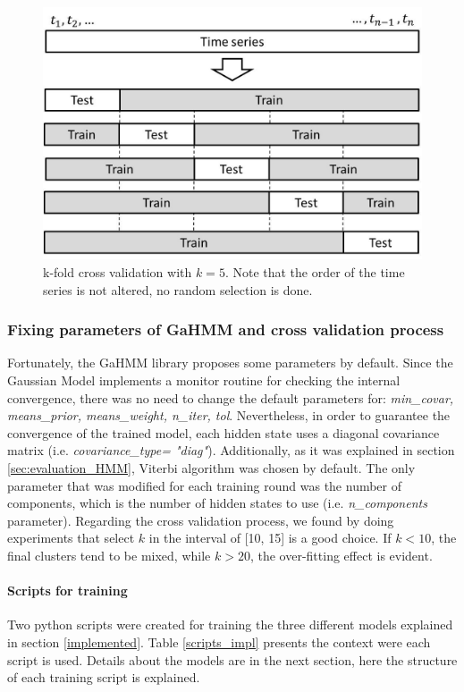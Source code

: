 \begin{figure}[h!]
  \vspace{0.5em} %
  \includegraphics[scale=0.45]{Figures/k-fold.jpg}
  \caption{k-fold cross validation with $k=5$. Note that the order of the time series is not altered, no random selection is done.}
  \label{fig:k-fold}
\end{figure}


\subsubsection{Fixing parameters of GaHMM and cross validation process}

Fortunately, the GaHMM library  \cite{gahmm_manual} proposes some parameters by default. Since the Gaussian Model implements a monitor routine for checking the internal convergence, there was no need to change the default parameters for: \textit{min\_covar, means\_prior, means\_weight, n\_iter, tol}. Nevertheless, in order to guarantee the convergence of the trained model, each hidden state uses a diagonal covariance matrix (i.e. \textit{covariance\_type= "diag"}). Additionally, as it was explained in section \ref{sec:evaluation_HMM}, Viterbi algorithm was chosen by default. The only parameter that was modified for each training round was the number of components, which is the number of hidden states to use (i.e. \textit{n\_components} parameter). Regarding the cross validation process, we found by doing experiments that select $k$ in the interval of [10, 15] is a good choice. If $k < 10$, the final clusters tend to be mixed, while $k > 20$, the over-fitting effect is evident.  


\paragraph{Scripts for training}
Two python scripts were created for training the three different models explained in section \ref{implemented}. Table \ref{scripts_impl} presents the context were each script is used. Details about the models are in the next section, here the structure of each training script is explained.  

